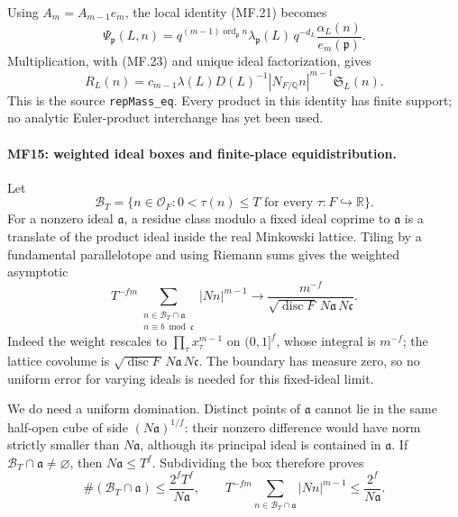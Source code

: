 Using \(A_m=A_{m-1}e_m\), the local identity (MF.21) becomes
\[
 \Psi_{\mathfrak p}(L,n)=
 q^{(m-1)\operatorname{ord}_{\mathfrak p}n}
       \lambda_{\mathfrak p}(L)\,q^{-d_L}
                   \frac{\alpha_L(n)}{e_m(\mathfrak p)}.
                                                               \tag{MF.32}
\]
Multiplication, with (MF.23) and unique ideal factorization, gives
\[
 R_L(n)=c_{m-1}\lambda(L)D(L)^{-1}
                  |N_{F/\mathbb Q}n|^{m-1}\mathfrak S_L(n).
                                                               \tag{MF.33}
\]
This is the source \texttt{repMass\_eq}. Every product in this
identity has finite support; no analytic Euler-product interchange
has yet been used.

\paragraph{MF15: weighted ideal boxes and finite-place equidistribution.}
Let
\[
 \mathcal B_T=\{n\in\mathcal O_F:0<\tau(n)\le T
                                  \text{ for every }\tau:F\hookrightarrow\mathbb R\}.
\]
For a nonzero ideal \(\mathfrak a\), a residue class modulo a fixed
ideal coprime to \(\mathfrak a\) is a translate of the product ideal
inside the real Minkowski lattice. Tiling by a fundamental
parallelotope and using Riemann sums gives the weighted asymptotic
\[
 T^{-fm}\sum_{\substack{n\in\mathcal B_T\cap\mathfrak a\\
                         n\equiv b\bmod\mathfrak c}}
       |Nn|^{m-1}
       \longrightarrow
       \frac{m^{-f}}{\sqrt{\operatorname{disc}F}\,
                                  N\mathfrak a\,N\mathfrak c}.
                                                               \tag{MF.34}
\]
Indeed the weight rescales to
\(\prod_\tau x_\tau^{m-1}\) on \((0,1]^f\), whose integral is
\(m^{-f}\); the lattice covolume is
\(\sqrt{\operatorname{disc}F}\,N\mathfrak a\,N\mathfrak c\).
The boundary has measure zero, so no uniform error for varying
ideals is needed for this fixed-ideal limit.

We do need a uniform domination. Distinct points of \(\mathfrak a\)
cannot lie in the same half-open cube of side
\((N\mathfrak a)^{1/f}\): their nonzero difference would have norm
strictly smaller than \(N\mathfrak a\), although its principal ideal
is contained in \(\mathfrak a\).
If \(\mathcal B_T\cap\mathfrak a\ne\varnothing\), then
\(N\mathfrak a\le T^f\). Subdividing the box therefore proves
\[
 \#(\mathcal B_T\cap\mathfrak a)
      \le\frac{2^fT^f}{N\mathfrak a},\qquad
 T^{-fm}\sum_{n\in\mathcal B_T\cap\mathfrak a}|Nn|^{m-1}
      \le\frac{2^f}{N\mathfrak a}.                    \tag{MF.35}
\]

